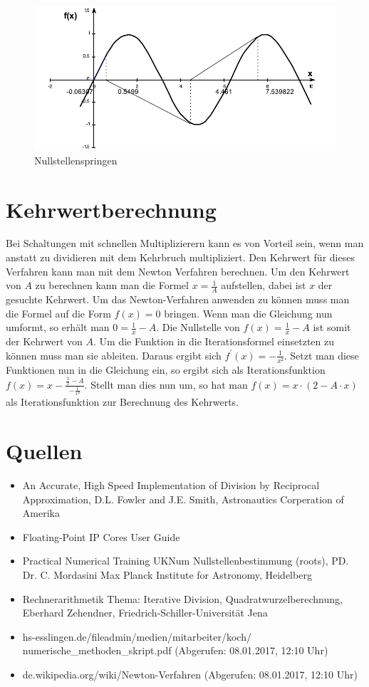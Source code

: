 \documentclass[a4paper,12pt,fleqn,oneside]{article}
\begin{document}
		\begin{figure}
			\centering
			\includegraphics[width=0.5\linewidth]{hupfen.png}
			\caption{Nullstellenspringen}
			\label{fig:hupfen}
		\end{figure}

\newpage

\section{Kehrwertberechnung}

	Bei Schaltungen mit schnellen Multiplizierern kann es von Vorteil sein, wenn man anstatt zu dividieren mit dem Kehrbruch multipliziert. Den Kehrwert
	für dieses Verfahren kann man mit dem Newton Verfahren berechnen. Um den Kehrwert von $A$ zu berechnen kann man die Formel $x = \frac{1}{A}$
	aufstellen, dabei ist $x$ der gesuchte Kehrwert. Um das Newton-Verfahren anwenden zu können muss man die Formel auf die Form $f(x) = 0$ bringen.
	Wenn man die Gleichung nun umformt, so erhält man $0 = \frac{1}{x} - A$. Die Nullstelle von $f(x) = \frac{1}{x} - A$ ist somit der Kehrwert von $A$.
	Um die Funktion in die Iterationsformel einsetzten zu können muss man sie ableiten. Daraus ergibt sich $f^\prime(x) = -\frac{1}{x²}$. Setzt man diese
	Funktionen nun in die Gleichung ein, so ergibt sich als Iterationsfunktion $f(x) = x- \frac{\frac{1}{x} - A}{-\frac{1}{x²}}$. Stellt man dies nun um, so hat
	man $f(x) = x \cdot (2 - A \cdot x)$ als Iterationsfunktion zur Berechnung des Kehrwerts.

\newpage

\section{Quellen}
	\begin{itemize}
		\item An Accurate, High Speed Implementation of Division by Reciprocal Approximation, D.L. Fowler and J.E. Smith, Astronautics Corperation of
			Amerika
		\item Floating-Point IP Cores User Guide
		\item Practical Numerical Training UKNum Nullstellenbestimmung (roots), PD. Dr. C. Mordasini Max Planck Institute for Astronomy, Heidelberg
		\item Rechnerarithmetik Thema: Iterative Division, Quadratwurzelberechnung, Eberhard Zehendner, Friedrich-Schiller-Universität Jena
		\item hs-esslingen.de/fileadmin/medien/mitarbeiter/koch/\\numerische\_methoden\_skript.pdf (Abgerufen: 08.01.2017, 12:10 Uhr)
		\item de.wikipedia.org/wiki/Newton-Verfahren (Abgerufen: 08.01.2017, 12:10 Uhr)
	\end{itemize}
\end{document}
